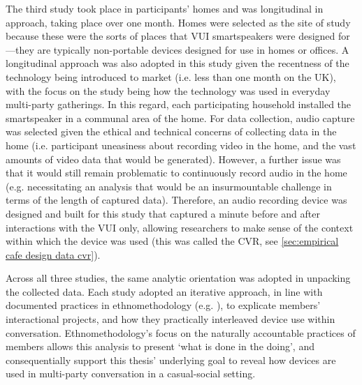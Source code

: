 \begin{revisedsubmission}
The third study took place in participants' homes and was longitudinal in approach, taking place over one month.
Homes were selected as the site of study because these were the sorts of places that \ac{VUI} smartspeakers were designed for---they are typically non-portable devices designed for use in homes or offices.
A longitudinal approach was also adopted in this study given the recentness of the technology being introduced to market (i.e. less than one month on the UK), with the focus on the study being how the technology was used in everyday multi-party gatherings.
In this regard, each participating household installed the smartspeaker in a communal area of the home.
For data collection, audio capture was selected given the ethical and technical concerns of collecting data in the home (i.e. participant uneasiness about recording video in the home, and the vast amounts of video data that would be generated).
However, a further issue was that it would still remain problematic to continuously record audio in the home (e.g. necessitating an analysis that would be an insurmountable challenge in terms of the length of captured data).
Therefore, an audio recording device was designed and built for this study that captured a minute before and after interactions with the \ac{VUI} only, allowing researchers to make sense of the context within which the device was used (this was called the \acf{CVR}, see \ref{sec:empirical cafe design data cvr}).

Across all three studies, the same analytic orientation was adopted in unpacking the collected data.
Each study adopted an iterative approach, in line with documented practices in ethnomethodology (e.g. \citet{Crabtree2012,Heath2010}), to explicate members' interactional projects, and how they practically interleaved device use within conversation.
Ethnomethodology's focus on the naturally accountable practices of members allows this analysis to present `what is done in the doing', and consequentially support this thesis' underlying goal to reveal how devices are used in multi-party conversation in a casual-social setting.

\end{revisedsubmission}

